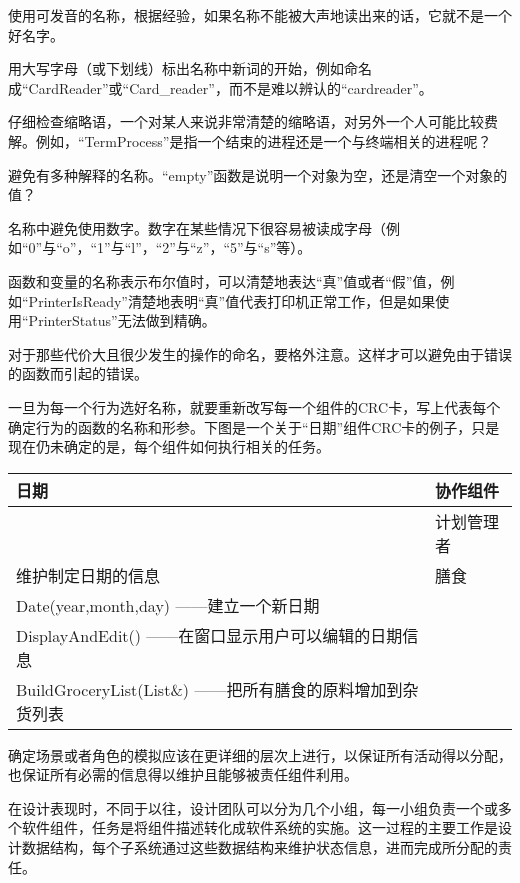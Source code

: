 \begin{compactitem}
\item 使用可发音的名称，根据经验，如果名称不能被大声地读出来的话，它就不是一个好名字。
\item 用大写字母（或下划线）标出名称中新词的开始，例如命名成“CardReader”或“Card\_reader”，而不是难以辨认的“cardreader”。
\item 仔细检查缩略语，一个对某人来说非常清楚的缩略语，对另外一个人可能比较费解。例如，“TermProcess”是指一个结束的进程还是一个与终端相关的进程呢？
\item 避免有多种解释的名称。“empty”函数是说明一个对象为空，还是清空一个对象的值？
\item 名称中避免使用数字。数字在某些情况下很容易被读成字母（例如“0”与“o”，“1”与“l”，“2”与“z”，“5”与“s”等）。
\item 函数和变量的名称表示布尔值时，可以清楚地表达“真”值或者“假”值，例如“PrinterIsReady”清楚地表明“真”值代表打印机正常工作，但是如果使用“PrinterStatus”无法做到精确。
\item 对于那些代价大且很少发生的操作的命名，要格外注意。这样才可以避免由于错误的函数而引起的错误。
\end{compactitem}


一旦为每一个行为选好名称，就要重新改写每一个组件的CRC卡，写上代表每个确定行为的函数的名称和形参。下图是一个关于“日期”组件CRC卡的例子，只是现在仍未确定的是，每个组件如何执行相关的任务。


\begin{table}[htbp]
\centering
\begin{tabular}{|l|l|}
\hline
日期							&协作组件\\
\hline
							&计划管理者\\
\hline
维护制定日期的信息			&膳食\\
\hline
Date(year,month,day)	——建立一个新日期&\\
\hline
DisplayAndEdit()		——在窗口显示用户可以编辑的日期信息&\\
\hline
BuildGroceryList(List\&)	——把所有膳食的原料增加到杂货列表&\\
\hline
\end{tabular}
\end{table}



确定场景或者角色的模拟应该在更详细的层次上进行，以保证所有活动得以分配，也保证所有必需的信息得以维护且能够被责任组件利用。

在设计表现时，不同于以往，设计团队可以分为几个小组，每一小组负责一个或多个软件组件，任务是将组件描述转化成软件系统的实施。这一过程的主要工作是设计数据结构，每个子系统通过这些数据结构来维护状态信息，进而完成所分配的责任。

